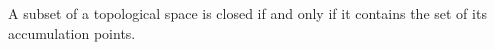 A subset of a topological space is closed if and only if it contains the set of its accumulation points.
